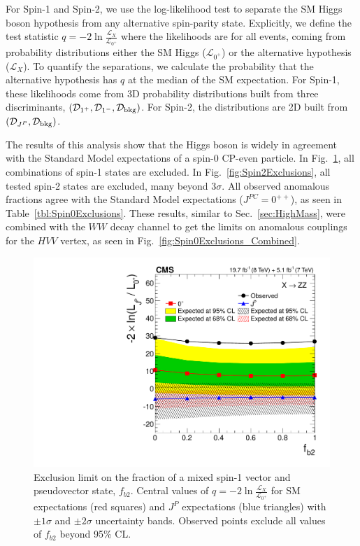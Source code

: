 For Spin-1 and Spin-2, we use the log-likelihood test to separate the SM Higgs boson hypothesis from any alternative spin-parity state. Explicitly, we define the test statistic $q = -2 \ln \frac{\mathcal{L}_X}{\mathcal{L}_{0^+}}$ where the likelihoods are for all events, coming from probability distributions either the SM Higgs ($\mathcal{L}_{0^+}$) or the alternative hypothesis ($\mathcal{L}_{X}$). To quantify the separations, we calculate the probability that the alternative hypothesis has $q$ at the median of the SM expectation. For Spin-1, these likelihoods come from 3D probability distributions built from three discriminants, $({\mathcal{D}}_{1^+},{\mathcal{D}}_{1^-},{\mathcal{D}}_{\rm bkg})$. For Spin-2, the distributions are 2D built from $({\mathcal{D}}_{J^P},{\mathcal{D}}_{\rm bkg})$.

The results of this analysis show that the Higgs boson is widely in agreement with the Standard Model expectations of a spin-0 CP-even particle. In Fig.~\ref{fig:Spin1Exclusions}, all combinations of spin-1 states are excluded. In Fig.~\ref{fig:Spin2Exclusions}, all tested spin-2 states are excluded, many beyond $3\sigma$. All observed anomalous fractions agree with the Standard Model expectations ($J^{PC} = 0^{++}$), as seen in Table~\ref{tbl:Spin0Exclusions}. These results, similar to Sec.~\ref{sec:HighMass}, were combined \cite{Khachatryan:2014kca} with the $WW$ decay channel to get the limits on anomalous couplings for the $HVV$ vertex, as seen in Fig.~\ref{fig:Spin0Exclusions_Combined}.

\begin{figure}[htbp]
\begin{center}
\includegraphics[width=.6\linewidth]{HiggsProperties/figures/summary_PI.pdf}
\caption[Exclusion Limits on Mixed Spin-1 State in $4\ell$ for $125.6$ $\rm{GeV}$ Higgs Boson]{Exclusion limit on the fraction of a mixed spin-1 vector and pseudovector state, $f_{b2}$. Central values of $q = -2 \ln \frac{\mathcal{L}_X}{\mathcal{L}_{0^+}}$ for SM expectations (red squares) and $J^P$ expectations (blue triangles) with $\pm1\sigma$ and $\pm2\sigma$ uncertainty bands. Observed points exclude all values of $f_{b2}$ beyond 95\% CL.}
\label{fig:Spin1Exclusions}
\end{center}
\end{figure}

